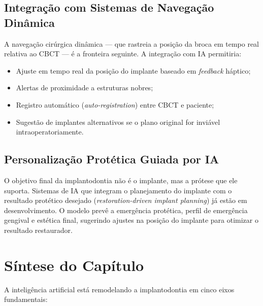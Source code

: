 \subsection{Integração com Sistemas de Navegação Dinâmica}

A navegação cirúrgica dinâmica --- que rastreia a posição da broca em tempo real relativa ao CBCT --- é a fronteira seguinte. A integração com IA permitiria:
\begin{itemize}
    \item Ajuste em tempo real da posição do implante baseado em \textit{feedback} háptico;
    \item Alertas de proximidade a estruturas nobres;
    \item Registro automático (\textit{auto-registration}) entre CBCT e paciente;
    \item Sugestão de implantes alternativos se o plano original for inviável intraoperatoriamente.
\end{itemize}

\subsection{Personalização Protética Guiada por IA}

O objetivo final da implantodontia não é o implante, mas a prótese que ele suporta. Sistemas de IA que integram o planejamento do implante com o resultado protético desejado (\textit{restoration-driven implant planning}) já estão em desenvolvimento. O modelo prevê a emergência protética, perfil de emergência gengival e estética final, sugerindo ajustes na posição do implante para otimizar o resultado restaurador.

\section{Síntese do Capítulo}

A inteligência artificial está remodelando a implantodontia em cinco eixos fundamentais:

